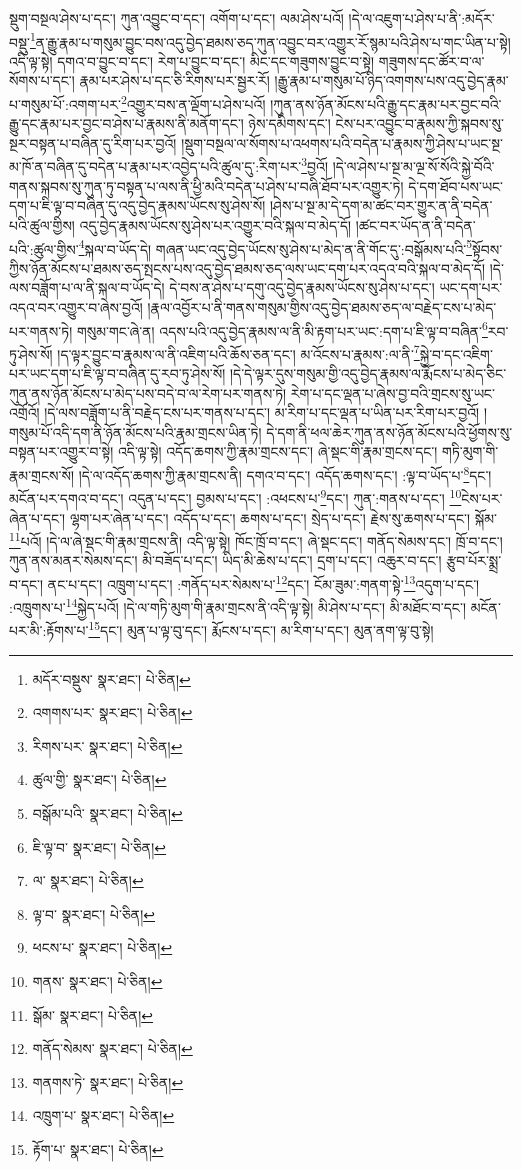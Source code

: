 སྡུག་བསྔལ་ཤེས་པ་དང་། ཀུན་འབྱུང་བ་དང་། འགོག་པ་དང་། ལམ་ཤེས་པའོ། །དེ་ལ་འཇུག་པ་ཤེས་པ་ནི་:མདོར་བསྡུ་\footnote{མདོར་བསྡུས་  སྣར་ཐང་།  པེ་ཅིན། }ན་རྒྱུ་རྣམ་པ་གསུམ་བྱུང་བས་འདུ་བྱེད་ཐམས་ཅད་ཀུན་འབྱུང་བར་འགྱུར་རོ་སྙམ་པའི་ཤེས་པ་གང་ཡིན་པ་སྟེ། འདི་ལྟ་སྟེ། དགའ་བ་བྱུང་བ་དང་། རེག་པ་བྱུང་བ་དང་། མིང་དང་གཟུགས་བྱུང་བ་སྟེ། གཟུགས་དང་ཚོར་བ་ལ་སོགས་པ་དང་། རྣམ་པར་ཤེས་པ་དང་ཅི་རིགས་པར་སྦྱར་རོ། །རྒྱུ་རྣམ་པ་གསུམ་པོ་ཉིད་འགགས་པས་འདུ་བྱེད་རྣམ་པ་གསུམ་པོ་:འགག་པར་\footnote{འགགས་པར་  སྣར་ཐང་།  པེ་ཅིན། }འགྱུར་བས་ན་ལྡོག་པ་ཤེས་པའོ། །ཀུན་ནས་ཉོན་མོངས་པའི་རྒྱུ་དང་རྣམ་པར་བྱང་བའི་རྒྱུ་དང་རྣམ་པར་བྱང་བ་ཤེས་པ་རྣམས་ནི་མནོག་དང་། ཉེས་དམིགས་དང་། ངེས་པར་འབྱུང་བ་རྣམས་ཀྱི་སྐབས་སུ་སྔར་བསྟན་པ་བཞིན་དུ་རིག་པར་བྱའོ། །སྡུག་བསྔལ་ལ་སོགས་པ་འཕགས་པའི་བདེན་པ་རྣམས་ཀྱི་ཤེས་པ་ཡང་སྔ་མ་ཁོ་ན་བཞིན་དུ་བདེན་པ་རྣམ་པར་འབྱེད་པའི་ཚུལ་དུ་:རིག་པར་\footnote{རིགས་པར་  སྣར་ཐང་།  པེ་ཅིན། }བྱའོ། །དེ་ལ་ཤེས་པ་སྔ་མ་ལྔ་སོ་སོའི་སྐྱེ་བོའི་གནས་སྐབས་སུ་ཀུན་ཏུ་བསྟན་པ་ལས་ནི་ཕྱི་མའི་བདེན་པ་ཤེས་པ་བཞི་ཐོབ་པར་འགྱུར་ཏེ། དེ་དག་ཐོབ་པས་ཡང་དག་པ་ཇི་ལྟ་བ་བཞིན་དུ་འདུ་བྱེད་རྣམས་ཡོངས་སུ་ཤེས་སོ། །ཤེས་པ་སྔ་མ་དེ་དག་མ་ཚང་བར་གྱུར་ན་ནི་བདེན་པའི་ཚུལ་གྱིས། འདུ་བྱེད་རྣམས་ཡོངས་སུ་ཤེས་པར་འགྱུར་བའི་སྐལ་བ་མེད་དོ། །ཚང་བར་ཡོད་ན་ནི་བདེན་པའི་:ཚུལ་གྱིས་\footnote{ཚུལ་གྱི་  སྣར་ཐང་།  པེ་ཅིན། }སྐལ་བ་ཡོད་དེ། གཞན་ཡང་འདུ་བྱེད་ཡོངས་སུ་ཤེས་པ་མེད་ན་ནི་གོང་དུ་:བསྒོམས་པའི་\footnote{བསྒོམ་པའི་  སྣར་ཐང་།  པེ་ཅིན། }སྟོབས་ཀྱིས་ཉོན་མོངས་པ་ཐམས་ཅད་སྤངས་པས་འདུ་བྱེད་ཐམས་ཅད་ལས་ཡང་དག་པར་འདའ་བའི་སྐལ་བ་མེད་དོ། །དེ་ལས་བཟློག་པ་ལ་ནི་སྐལ་བ་ཡོད་དེ། དེ་བས་ན་ཤེས་པ་དགུ་འདུ་བྱེད་རྣམས་ཡོངས་སུ་ཤེས་པ་དང་། ཡང་དག་པར་འདའ་བར་འགྱུར་བ་ཞེས་བྱའོ། །རྣལ་འབྱོར་པ་ནི་གནས་གསུམ་གྱིས་འདུ་བྱེད་ཐམས་ཅད་ལ་བརྗེད་ངས་པ་མེད་པར་གནས་ཏེ། གསུམ་གང་ཞེ་ན། འདས་པའི་འདུ་བྱེད་རྣམས་ལ་ནི་མི་རྟག་པར་ཡང་:དག་པ་ཇི་ལྟ་བ་བཞིན་\footnote{ཇི་ལྟ་བ་  སྣར་ཐང་།  པེ་ཅིན། }རབ་ཏུ་ཤེས་སོ། །ད་ལྟར་བྱུང་བ་རྣམས་ལ་ནི་འཇིག་པའི་ཆོས་ཅན་དང་། མ་འོངས་པ་རྣམས་:ལ་ནི་\footnote{ལ་  སྣར་ཐང་།  པེ་ཅིན། }སྐྱེ་བ་དང་འཇིག་པར་ཡང་དག་པ་ཇི་ལྟ་བ་བཞིན་དུ་རབ་ཏུ་ཤེས་སོ། །དེ་དེ་ལྟར་དུས་གསུམ་གྱི་འདུ་བྱེད་རྣམས་ལ་རྨོངས་པ་མེད་ཅིང་ཀུན་ནས་ཉོན་མོངས་པ་མེད་པས་བདེ་བ་ལ་རེག་པར་གནས་ཏེ། རེག་པ་དང་ལྡན་པ་ཞེས་བྱ་བའི་གྲངས་སུ་ཡང་འགྲོའོ། །དེ་ལས་བཟློག་པ་ནི་བརྗེད་ངས་པར་གནས་པ་དང་། མ་རིག་པ་དང་ལྡན་པ་ཡིན་པར་རིག་པར་བྱའོ། །གསུམ་པོ་འདི་དག་ནི་ཉོན་མོངས་པའི་རྣམ་གྲངས་ཡིན་ཏེ། དེ་དག་ནི་ཕལ་ཆེར་ཀུན་ནས་ཉོན་མོངས་པའི་ཕྱོགས་སུ་བསྟན་པར་འགྱུར་བ་སྟེ། འདི་ལྟ་སྟེ། འདོད་ཆགས་ཀྱི་རྣམ་གྲངས་དང་། ཞེ་སྡང་གི་རྣམ་གྲངས་དང་། གཏི་མུག་གི་རྣམ་གྲངས་སོ། །དེ་ལ་འདོད་ཆགས་ཀྱི་རྣམ་གྲངས་ནི། དགའ་བ་དང་། འདོད་ཆགས་དང་། :ལྟ་བ་ཡོད་པ་\footnote{ལྟ་བ་  སྣར་ཐང་།  པེ་ཅིན། }དང་། མངོན་པར་དགའ་བ་དང་། འདུན་པ་དང་། བྱམས་པ་དང་། :འཕངས་པ་\footnote{ཕངས་པ་  སྣར་ཐང་།  པེ་ཅིན། }དང་། ཀུན་:གནས་པ་དང་། \footnote{གནས་  སྣར་ཐང་།  པེ་ཅིན། }ངེས་པར་ཞེན་པ་དང་། ལྷག་པར་ཞེན་པ་དང་། འདོད་པ་དང་། ཆགས་པ་དང་། སྲེད་པ་དང་། རྗེས་སུ་ཆགས་པ་དང་། སྐོམ་\footnote{སྒོམ་  སྣར་ཐང་།  པེ་ཅིན། }པའོ། །དེ་ལ་ཞེ་སྡང་གི་རྣམ་གྲངས་ནི། འདི་ལྟ་སྟེ། ཁོང་ཁྲོ་བ་དང་། ཞེ་སྡང་དང་། གནོད་སེམས་དང་། ཁྲོ་བ་དང་། ཀུན་ནས་མནར་སེམས་དང་། མི་བཟོད་པ་དང་། ཡིད་མི་ཆེས་པ་དང་། དྲག་པ་དང་། འཆུར་བ་དང་། རྩུབ་པོར་སྨྲ་བ་དང་། ནང་པ་དང་། འཁྲུག་པ་དང་། :གནོད་པར་སེམས་པ་\footnote{གནོད་སེམས་  སྣར་ཐང་།  པེ་ཅིན། }དང་། ངོམ་ཟུམ་:གནག་སྟེ་\footnote{གནགས་ཏེ་  སྣར་ཐང་།  པེ་ཅིན། }འདུག་པ་དང་། :འཁྲུགས་པ་\footnote{འཁྲུག་པ་  སྣར་ཐང་།  པེ་ཅིན། }སྐྱེད་པའོ། །དེ་ལ་གཏི་མུག་གི་རྣམ་གྲངས་ནི་འདི་ལྟ་སྟེ། མི་ཤེས་པ་དང་། མི་མཐོང་བ་དང་། མངོན་པར་མི་:རྟོགས་པ་\footnote{རྟོག་པ་  སྣར་ཐང་།  པེ་ཅིན། }དང་། མུན་པ་ལྟ་བུ་དང་། རྨོངས་པ་དང་། མ་རིག་པ་དང་། མུན་ནག་ལྟ་བུ་སྟེ། 